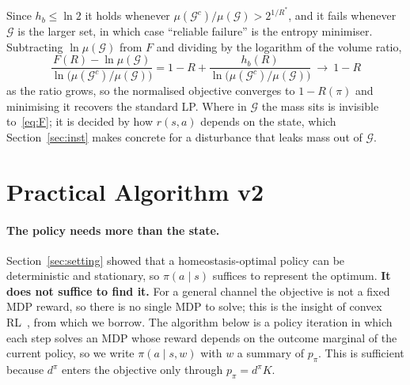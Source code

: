 \documentclass[11pt]{article}
\theoremstyle{remark}
\newcommand{\Gcal}{\mathcal G}
\newcommand{\1}{\mathds{1}}
\newcommand{\occ}{d^{\pi}}
\newcommand{\pz}{p_{\pi}}
\begin{document}
{Since $h_b\le\ln2$ it holds whenever $\mu(\Gcal^c)/\mu(\Gcal)>2^{1/R^\ast}$, and it fails whenever $\Gcal$ is the larger set, in which case ``reliable failure'' is the entropy minimiser.
Subtracting $\ln\mu(\Gcal)$ from $F$ and dividing by the logarithm of the volume ratio,
\begin{equation}
  \frac{F(R)-\ln\mu(\Gcal)}{\ln\big(\mu(\Gcal^c)/\mu(\Gcal)\big)}
  =1-R+\frac{h_b(R)}{\ln\big(\mu(\Gcal^c)/\mu(\Gcal)\big)}
  \ \longrightarrow\ 1-R
  \label{eq:limit}
\end{equation}
as the ratio grows, so the normalised objective converges to $1-R(\pi)$ and minimising it recovers the standard LP.
Where in $\Gcal$ the mass sits is invisible to~\eqref{eq:F}; it is decided by how $r(s,a)$ depends on the state, which Section~\ref{sec:inst} makes concrete for a disturbance that leaks mass out of $\Gcal$.
}


\section{Practical Algorithm v2}
\label{sec:algorithm}

\paragraph{The policy needs more than the state.}
Section~\ref{sec:setting} showed that a homeostasis-optimal policy can be deterministic and stationary, so $\pi(a\mid s)$ suffices to represent the optimum.
\textbf{It does not suffice to find it.}
For a general channel the objective is not a fixed MDP reward, so there is no single MDP to solve; this is the insight of convex RL~\citep{Hazan-provably19,Zahavy-reward21}, from which we borrow.
The algorithm below is a policy iteration in which each step solves an MDP whose reward depends on the outcome marginal of the current policy, so we write $\pi(a\mid s,w)$ with $w$ a summary of $\pz$.
This is sufficient because $\occ$ enters the objective only through $\pz=\occ K$.
\end{document}
